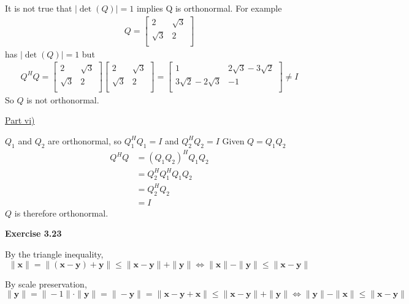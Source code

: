 \documentclass[letterpaper,12pt]{article}
\newcommand{\vect}[1]{\mathbf{#1}}
\begin{document}
It is not true that $|\det(Q)| = 1$ implies Q is orthonormal. For example
\begin{align*}
  Q = 
  \begin{bmatrix}
    2 & \sqrt{3} \\
    \sqrt{3} & 2 \\
  \end{bmatrix}
\end{align*}
has $|\det(Q)| = 1$ but
\begin{align*}
  Q^HQ = 
  \begin{bmatrix}
    2 & \sqrt{3} \\
    \sqrt{3} & 2 \\
  \end{bmatrix}
  \begin{bmatrix}
    2 & \sqrt{3} \\
    \sqrt{3} & 2 \\
  \end{bmatrix}
  =
  \begin{bmatrix}
    1 & 2\sqrt{3} - 3\sqrt{2} \\
    3\sqrt{2} -  2\sqrt{3} & -1 \\
  \end{bmatrix}
  \neq I
\end{align*}
So $Q$ is not orthonormal.

\underline{Part vi)}

$Q_1$ and $Q_2$ are orthonormal, so $Q_1^HQ_1 = I$ and $Q_2^HQ_2 = I$
Given $Q = Q_1 Q_2$
\begin{align*}
  Q^HQ &= (Q_1Q_2)^HQ_1Q_2 \\
  &= Q_2^H Q_1^H Q_1 Q_2 \\
  &= Q_2^H Q_2 \\
  &= I
\end{align*}
$Q$ is therefore orthonormal.

\textbf{Exercise 3.23}

By the triangle inequality,
\begin{equation*}
  \|\vect{x}\| = \|(\vect{x} - \vect{y}) + \vect{y}\| \leq \|\vect{x} - \vect{y}\| + \|\vect{y}\|
  \Leftrightarrow \|\vect{x}\| - \|\vect{y}\| \leq \|\vect{x} - \vect{y}\|
\end{equation*}

By scale preservation,
\begin{equation*}
  \|\vect{y}\| = \|-1\| \cdot \|\vect{y}\| = \|-\vect{y}\| = \|\vect{x} - \vect{y} + \vect{x}\| \leq \|\vect{x} - \vect{y}\| + \|\vect{y}\|
  \Leftrightarrow \|\vect{y}\| - \|\vect{x}\| \leq \|\vect{x} - \vect{y}\|
\end{equation*}
\end{document}
